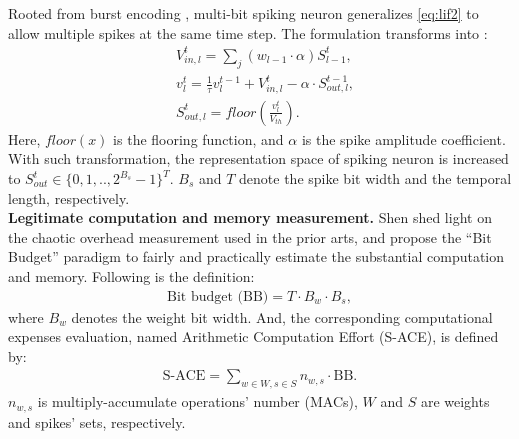 Rooted from burst encoding \cite{liefficient}, multi-bit spiking neuron generalizes  \cref{eq:lif2} to allow multiple spikes at the same time step. The formulation transforms into \cite{shen2024conventional,xiao2024multi,xing2024spikellm}:
\begin{align}
     &V_{in,l}^t=\sum_j( w_{l-1}\cdot \alpha)S_{l-1}^t,\label{eq:mlif1}\\
&v^t_l=\frac{1}{\tau}v_l^{t-1}+ V^t_{in,l} - \alpha \cdot S^{t-1}_{out,l},\label{eq:mlif2}
\\
&S^t_{out,l}=floor(\frac{v^t_l}{V_{th}}).\label{eq:mlif3}
\end{align}
Here, $floor(x)$ is the flooring function, and $\alpha$ is the spike amplitude coefficient.
With such transformation, the representation space of spiking neuron is increased to $S^t_{out}\in \{0,1,..,2^{B_s}-1\}^T$. $B_s$ and $T$ denote the spike bit width and the temporal length, respectively.
\\\textbf{Legitimate computation and memory measurement.}
Shen \etal \cite{shen2024conventional} shed light on the chaotic overhead measurement used in the prior arts, and propose the “Bit Budget” paradigm to fairly and practically estimate the substantial computation and memory. Following is the definition:
\begin{align}
    \text{Bit budget (BB)} = T \cdot B_{w} \cdot B_{s},\label{eq:bit budget}
\end{align}
where $B_{w}$ denotes the weight bit width. And, the corresponding  computational expenses evaluation, named Arithmetic Computation Effort (S-ACE), is defined by:
\begin{align}
    \text{S-ACE} = \sum_{w\in W, s\in S} n_{w,s}\cdot \text{BB} .\label{eq:sace}
\end{align}
$n_{w,s}$ is multiply-accumulate operations' number (MACs), $W$ and $S$ are weights and spikes' sets, respectively.  


